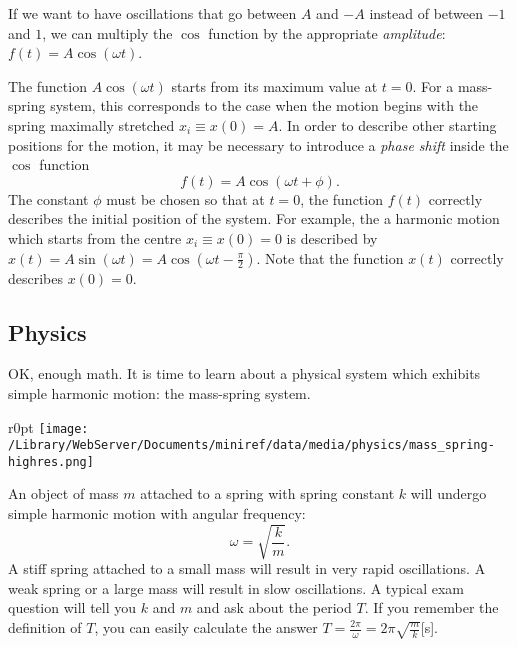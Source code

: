 \documentclass[letterpaper,9pt,journal]{IEEEtran}
\newcommand{\be}{\begin{equation}}
\newcommand{\ee}{\end{equation}}
\begin{document}
If we want to have oscillations that go between $A$ and $-A$ instead
of between $-1$ and $1$, we can multiply the $\cos$ function by the appropriate \emph{amplitude}:
$f(t)=A\cos(\omega t)$.

The function $A\cos(\omega t)$ starts from its maximum value at $t=0$.
For a mass-spring system, this corresponds to the case 
when the motion begins with the spring maximally stretched $x_i\equiv x(0)=A$. 
In order to describe other starting positions for the motion, 
it may be necessary to introduce a \emph{phase shift} inside the $\cos$ function
\[
 f(t)=A\cos(\omega t   + \phi).
\]
The constant $\phi$ must be chosen so that at $t=0$, the function $f(t)$ correctly 
describes the initial position of the system.
For example, the a harmonic motion which starts from the centre $x_i \equiv x(0)=0$
is described by $x(t) =  A\sin(\omega t)=A\cos\!\left(\omega t - \frac{\pi}{2}\right)$.
Note that the function $x(t)$ correctly describes %
$x(0)=0$.


\vspace{-3mm}
\subsection{Physics}

OK, enough math. It is time to learn about a physical system which exhibits 
simple harmonic motion: the mass-spring system.
\begin{wrapfigure}{r}{0pt}
\texttt{[image: /Library/WebServer/Documents/miniref/data/media/physics/mass\_spring-highres.png]}
\end{wrapfigure}
An object of mass $m$ attached to a spring with spring constant $k$
will undergo simple harmonic motion with angular frequency:
\be
 \omega = \sqrt{ \frac{k}{m} }.	
 \label{OMEGA-MASS-SPRING}
\ee
A stiff spring attached to a small mass will result in very rapid oscillations.
A weak spring or a large mass will result in slow oscillations.
%
A typical exam question will tell you $k$ and $m$ and ask about the period $T$.
If you remember the definition of $T$, you can easily calculate the answer $T = \frac{2\pi}{\omega} =  2\pi \sqrt{ \frac{m}{k} }$[s].
\end{document}
